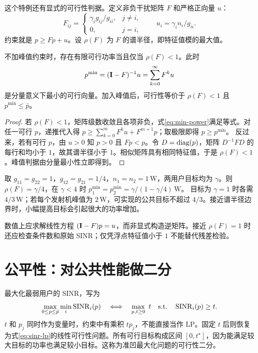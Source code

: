 这个特例还有显式的可行性判据。定义非负干扰矩阵 $F$ 和严格正向量 $u$：
\begin{equation}
 F_{ij}=\begin{cases}\gamma_i g_{ij}/g_{ii},&j\ne i,\\0,&j=i,\end{cases}
 \qquad u_i=\gamma_i n_i/g_{ii}.
\end{equation}
约束就是 $p\geq Fp+u$。设 $\rho(F)$ 为 $F$ 的谱半径，即特征值模的最大值。

\begin{proposition}[最小可行功率]
不加峰值约束时，存在有限可行功率当且仅当 $\rho(F)<1$。此时
\begin{equation}
 p^{\min}=(\mathbf I-F)^{-1}u=\sum_{k=0}^{\infty}F^k u
 \label{eq:min-power}
\end{equation}
是分量意义下最小的可行向量。加入峰值后，可行性等价于
$\rho(F)<1$ 且 $p^{\min}\leq\bar p$。
\end{proposition}
\begin{proof}
若 $\rho(F)<1$，矩阵级数收敛且各项非负，式\eqref{eq:min-power}满足等式。对任一可行 $p$，递推代入得
$p\geq\sum_{k=0}^{m}F^k u+F^{m+1}p$；取极限即得 $p\geq p^{\min}$。
反过来，若有可行 $p$，由 $u>0$ 知 $p>0$ 且 $Fp<p$。令 $D=\operatorname{diag}(p)$，矩阵 $D^{-1}FD$ 的每行和均小于 $1$，故其谱半径小于 $1$。相似矩阵具有相同特征值，于是 $\rho(F)<1$。峰值判据由分量最小性立即得到。
\end{proof}

\begin{example}[干扰反馈的代价]
取 $g_{11}=g_{22}=1$，$g_{12}=g_{21}=1/4$，$n_1=n_2=1\,\mathrm W$，两用户目标均为 $\gamma$。则 $\rho(F)=\gamma/4$，在 $\gamma<4$ 时
$p_1^{\min}=p_2^{\min}=\gamma/(1-\gamma/4)\,\mathrm W$。
目标为 $\gamma=1$ 时各需 $4/3\,\mathrm W$；若每个发射机峰值为 $2\,\mathrm W$，可实现的公共目标不超过 $4/3$。接近谱半径边界时，小幅提高目标会引起很大的功率增加。
\end{example}

数值上应求解线性方程 $(\mathbf I-F)p=u$，而非显式构造逆矩阵。接近 $\rho(F)=1$ 时还应检查条件数和原始 SINR；仅凭浮点特征值小于 $1$ 不能替代残差检验。

\section{公平性：对公共性能做二分}
最大化最弱用户的 SINR，写为
\begin{equation}
 \max_{0\leq p\leq\bar p}\min_i\operatorname{SINR}_i(p)
 \quad\Longleftrightarrow\quad
 \max_{p,t\geq0}\ t\quad\text{s.t.}\quad\operatorname{SINR}_i(p)\geq t.
 \label{eq:maxmin-sinr}
\end{equation}
$t$ 和 $p_j$ 同时作为变量时，约束中有乘积 $tp_j$，不能直接当作 LP。固定 $t$ 后则恢复为式\eqref{eq:sinr-lp}的线性可行性问题。所有可行目标构成区间 $[0,t^\star]$，因为能满足较大目标的功率也满足较小目标。这称为准凹最大化问题的可行性二分\cite{boyd2004,cvxpyexamples}。

